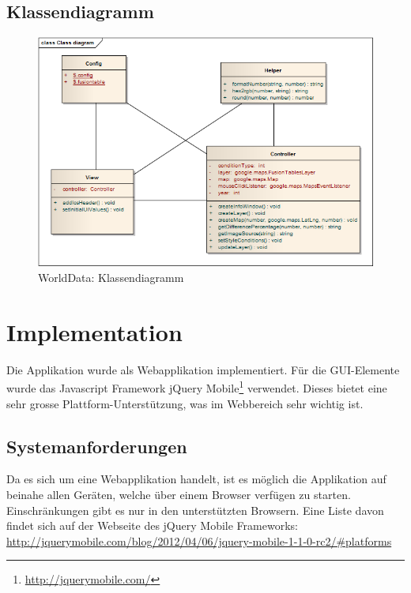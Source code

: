 \subsection{Klassendiagramm}
\begin{figure}[H]
	\centering
	\includegraphics[width=\textwidth]{images/usecase1-worlddata/uml/worlddata-classdiagram}
	\caption{WorldData: Klassendiagramm}
	\label{worlddata-classdiagram}
\end{figure}

\section{Implementation}
Die Applikation wurde als Webapplikation implementiert. Für die GUI-Elemente wurde das Javascript Framework jQuery Mobile\footnote{\url{http://jquerymobile.com/}} verwendet. Dieses bietet eine sehr grosse Plattform-Unterstützung, was im Webbereich sehr wichtig ist.

\subsection{Systemanforderungen}
Da es sich um eine Webapplikation handelt, ist es möglich die Applikation auf beinahe allen Geräten, welche über einem Browser verfügen zu starten. Einschränkungen gibt es nur in den unterstützten Browsern. Eine Liste davon findet sich auf der Webseite des jQuery Mobile Frameworks:  \url{http://jquerymobile.com/blog/2012/04/06/jquery-mobile-1-1-0-rc2/#platforms}

